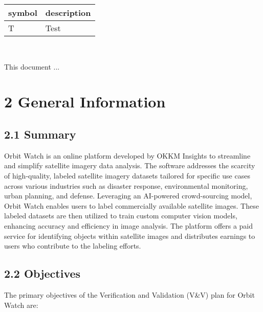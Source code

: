 \documentclass[12pt, titlepage]{article}
\begin{document}
\renewcommand{\arraystretch}{1.2}
\begin{tabular}{l l} 
  \toprule		
  \textbf{symbol} & \textbf{description}\\
  \midrule 
  T & Test\\
  \bottomrule
\end{tabular}\\



\newpage


This document ... 

  \section{2 General Information}

  \subsection{2.1 Summary} \cite{Problem_Statement}
  
  Orbit Watch is an online platform developed by OKKM Insights to streamline and simplify satellite imagery data analysis. The software addresses the scarcity of high-quality, labeled satellite imagery datasets tailored for specific use cases across various industries such as disaster response, environmental monitoring, urban planning, and defense. Leveraging an AI-powered crowd-sourcing model, Orbit Watch enables users to label commercially available satellite images. These labeled datasets are then utilized to train custom computer vision models, enhancing accuracy and efficiency in image analysis. The platform offers a paid service for identifying objects within satellite images and distributes earnings to users who contribute to the labeling efforts.
  
  \subsection{2.2 Objectives} \cite{Problem_Statement}
  
  The primary objectives of the Verification and Validation (V\&V) plan for Orbit Watch are:
  
\end{document}
